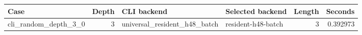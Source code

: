 {\small
\begin{tabular}{lrllrr}
\hline
Case & Depth & CLI backend & Selected backend & Length & Seconds \\
\hline
cli\_random\_depth\_3\_0 & 3 & universal\_resident\_h48\_batch & resident-h48-batch & 3 & 0.392973 \\
\hline
\end{tabular}
}
